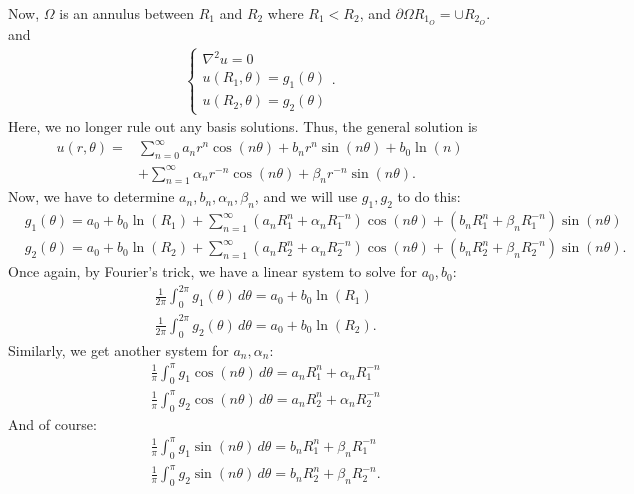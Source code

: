 \documentclass{article}
\theoremstyle{definition}
\newcommand{\p}{\partial}
\newcommand{\f}[2]{\frac{#1}{#2}}
\begin{document}
Now, $\Omega$ is an annulus between $R_1 $ and $R_2$ where $R_1 < R_2$, and $\p \Omega R_{1_{O}} =   \cup R_{2_{O}}$. and  
\begin{align*}
\begin{cases}
\nabla^2 u = 0\\
u(R_1,\theta) = g_1(\theta)\\
u(R_2,\theta) = g_2(\theta)
\end{cases}.
\end{align*}
Here, we no longer rule out any basis solutions. Thus, the general solution is
\begin{align*}
u(r,\theta) =& \sum^\infty_{n=0} a_n r^n \cos(n\theta) + b_n r^{n}\sin(n\theta) + b_0\ln(n) \\
&+\sum^\infty_{n=1}\alpha_n r^{-n}\cos(n\theta) + \beta_n r^{-n}\sin(n\theta). 
\end{align*}
Now, we have to determine $a_n, b_n, \alpha_n, \beta_n$, and we will use $g_1, g_2$ to do this: 
\begin{align*}
&g_1(\theta) = a_0 + b_0\ln(R_1) + \sum^\infty_{n=1}(a_n R_1^n + \alpha_n R_1^{-n})\cos(n\theta) + (b_n R_1^n + \beta_n R_1^{-n})\sin(n\theta)\\
&g_2(\theta) = a_0 + b_0\ln(R_2) + \sum^\infty_{n=1}(a_n R_2^n + \alpha_n R_2^{-n})\cos(n\theta) + (b_n R_2^n + \beta_n R_2^{-n})\sin(n\theta).
\end{align*}
Once again, by Fourier's trick, we have a linear system to solve for $a_0, b_0$:
\begin{align*}
&\f{1}{2\pi}\int^{2\pi}_0g_1(\theta)\,d\theta = a_0 + b_0 \ln(R_1)\\
&\f{1}{2\pi}\int^{2\pi}_0g_2(\theta)\,d\theta = a_0 + b_0 \ln(R_2).
\end{align*}
Similarly, we get another system for $a_n, \alpha_n$:
\begin{align*}
&\f{1}{\pi}\int^{\pi}_0 g_1\cos(n\theta)\,d\theta = a_n R_1^n + \alpha_n R_1^{-n}\\
&\f{1}{\pi}\int^{\pi}_0 g_2\cos(n\theta)\,d\theta = a_n R_2^n + \alpha_n R_2^{-n}
\end{align*}
And of course:
\begin{align*}
&\f{1}{\pi}\int^{\pi}_0 g_1\sin(n\theta)\,d\theta = b_n R_1^n + \beta_n R_1^{-n}\\
&\f{1}{\pi}\int^{\pi}_0 g_2\sin(n\theta)\,d\theta = b_n R_2^n + \beta_n R_2^{-n}.
\end{align*}
\end{document}
